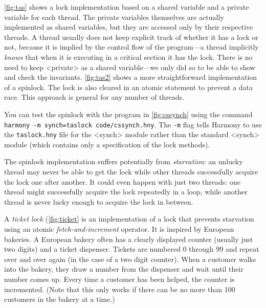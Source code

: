 \documentclass{report}
\begin{document}
\autoref{fig:tas} shows a lock implementation based on a shared
variable and a private variable for each thread.   The private
variables themselves are actually implemented as shared variables,
but they are accessed only by their respective threads.
A thread usually does not keep explicit track of whether it has a lock
or not, because it is implied by the control flow of the program---a
thread implicitly \emph{knows} that when it is executing in a critical
section it has the lock.
There is no need to keep <{private}> as a shared
variable---we only did so to be able to show and check the invariants.
\autoref{fig:tas2} shows a more straightforward implementation of a spinlock.
The lock is also cleared in an atomic statement to prevent a data race.
This approach is general for any number of threads.

You can test the spinlock with the program in \autoref{fig:cssynch}
using the command \texttt{harmony -m synch=taslock code/cssynch.hny}.
The \texttt{-m} flag tells Harmony to use the \texttt{taslock.hny} file
for the <{synch}> module rather than the standard <{synch}> module
(which contains only a specification of the lock methods).

%
The spinlock implementation suffers potentially from \emph{starvation}:
an unlucky thread may never be able to get the lock while other threads
successfully acquire the lock one after another.  It could even happen
with just two threads: one thread might successfully acquire the lock
repeatedly in a loop, while another thread is never lucky enough to
acquire the lock in between.

A \emph{ticket lock} (\autoref{fig:ticket} is an implementation of a
lock that prevents starvation using an atomic \emph{fetch-and-increment}
operator.  It is inspired by European bakeries.  A European bakery often has a
clearly displayed counter (usually just two digits) and a ticket dispenser.
Tickets are numbered 0 through 99 and repeat over and over again
(in the case of a two digit counter).
When a customer walks into the bakery, they draw a number from the dispenser
and wait until their number comes up.
Every time a customer has been helped, the counter is incremented.
(Note that this only works if there can be no more than 100 customers in
the bakery at a time.)
\end{document}
